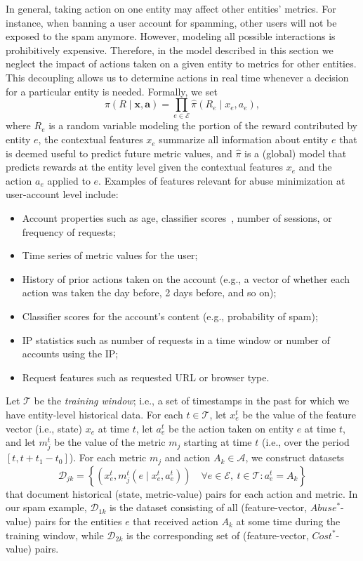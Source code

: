 In general, taking action on one entity may affect other entities' metrics. For instance, when banning a user account for spamming, other users will not be exposed to the spam anymore. However, modeling all possible interactions is prohibitively expensive. Therefore, in the model described in this section we neglect the impact of actions taken on a given entity to metrics for other entities.  This decoupling allows us to determine actions in real time whenever a decision for a particular entity is needed. Formally, we set
\begin{equation} \label{eq:decoupling_entities}
\pi (R\mid \mathbf{x},\mathbf{a}) = \prod_{e \in \mathcal{E}} \hat \pi (R_e\mid {x}_e,a_e),
\end{equation}
where $R_e$ is a random variable modeling the portion of the reward contributed by entity $e$, the contextual features $x_e$ summarize all information about entity $e$ that is deemed useful to predict future metric values, and $\hat \pi$ is a (global) model that predicts rewards at the entity level given the contextual features $x_e$ and the action $a_e$ applied to $e$. 
Examples of features relevant for abuse minimization at user-account level include:
\begin{itemize}
\squeezelist
    \item Account properties such as age, classifier scores\ifanon\else~\cite{xu2021deep}\fi, number of sessions, or frequency of requests;
    \item Time series of metric values for the user;
    \item History of prior actions taken on the account (e.g., a vector of whether each action was taken the day before, 2 days before, and so on);
    \item Classifier scores for the account's content (e.g., probability of spam);
    \item IP statistics such as number of requests in a time window or number of accounts using the IP;
    \item Request features such as requested URL or browser type.
\end{itemize}

Let $\mathcal{T}$ be the \emph{training window}; i.e., a set of timestamps in the past for which we have entity-level historical data. For each $t \in \mathcal{T}$, let $x_e^t$ be the value of the feature vector (i.e., state) $x_e$ at time $t$, let $a_e^t$ be the action taken on entity $e$ at time $t$, and let $m_j^t$ be the value of the metric $m_j$ starting at time $t$ (i.e., over the period $[t, t+t_1-t_0]$). For each metric $m_j$ and action $A_k \in \mathcal{A}$, we construct datasets
\[
\mathcal{D}_{jk} = \left\{\left(x_e^t, m^t_{j}(e \mid x_e^t, a_e^t)\right) \quad \forall e \in \mathcal{E},\ t \in \mathcal{T} : a_e^t = A_k\right\}
\]
that document historical (state, metric-value) pairs for each action and metric. In our spam example, $\mathcal{D}_{1k}$ is the dataset consisting of all (feature-vector, $Abuse^*$-value) pairs for the entities $e$ that received action $A_k$ at some time during the training window, while $\mathcal{D}_{2k}$ is the corresponding set of (feature-vector, $Cost^*$-value) pairs.


